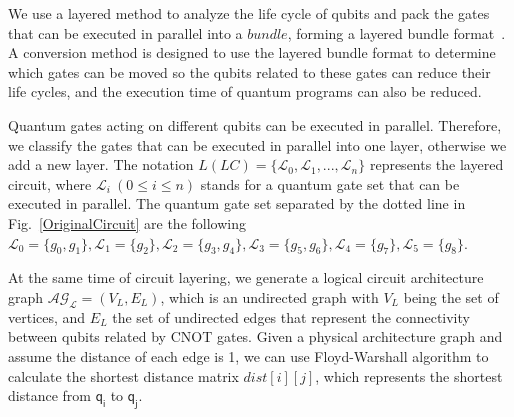 \documentclass[runningheads]{llncs}
\begin{document}
We use a layered method to analyze the life cycle of qubits and pack the gates that can be executed in parallel into a $bundle$, forming a layered bundle format~\cite{2019Zhang}.
A conversion method is designed to use the layered bundle format to determine which gates can be moved so the qubits related to these gates can reduce their life cycles, and the execution time of quantum programs can also be reduced. %

Quantum gates acting on different qubits can be executed in parallel. Therefore, we classify the gates that can be executed in parallel into one layer, otherwise we add a new layer. The notation $L(LC)=\{\mathcal{L}_{0},\mathcal{L}_{1},...,\mathcal{L}_{n}\}$ represents the layered circuit, where $\mathcal{L}_{i} \ (0 \le i \le n) $ stands for a quantum gate set that can be executed in parallel. The quantum gate set separated by the dotted line in Fig.~\ref{OriginalCircuit} are the following $\mathcal{L}_{0}=\{g_{0},g_{1}\},\mathcal{L}_{1}=\{g_{2}\},
\mathcal{L}_{2}=\{g_{3},g_{4}\},\mathcal{L}_{3}=\{g_{5},g_{6}\},\mathcal{L}_{4}=\{g_{7}\},\mathcal{L}_{5}=\{g_{8}\}$.

At the same time of circuit layering, we generate a logical circuit architecture graph $\mathcal{AG_{L}}=(V_{L},E_{L})$, which is an undirected graph with $V_{L}$ being the set of vertices, and $E_{L}$  the set of undirected edges that represent the connectivity between qubits related by CNOT gates.
Given a physical architecture graph and assume the distance of each edge is 1, we can use Floyd-Warshall algorithm to calculate the shortest distance matrix $dist[i][j]$, which represents the shortest distance from $\textsf{q}_{\textsf{i}}$ to $\textsf{q}_{\textsf{j}}$. 
\end{document}
